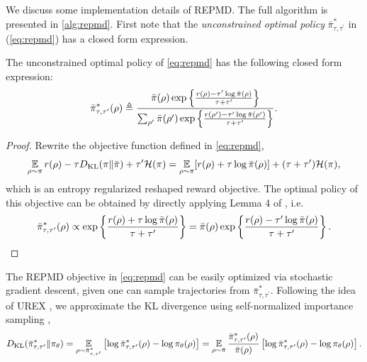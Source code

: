 \documentclass{article} %
\begin{document}
We discuss some implementation details of REPMD. The full algorithm is presented in \cref{alg:repmd}.
First note that the \emph{unconstrained optimal policy} $\bar{\pi}_{\tau,\tau^{\prime}}^*$ in (\ref{eq:repmd}) has a closed form expression.
\begin{lem}
\label{lem:opt_pi_ref}
The unconstrained optimal policy of \cref{eq:repmd} has the following closed form expression:
\begin{equation*}
	\bar{\pi}_{\tau,\tau^{\prime}}^*(\rho) \triangleq \frac{\bar{\pi}(\rho) \exp\left\{ \frac{r(\rho)-\tau^{\prime} \log \bar{\pi}(\rho) }{ \tau+\tau^{\prime}} \right\}}{ \sum_{\rho^{\prime}}{\bar{\pi}(\rho^{\prime}) \exp\left\{ \frac{r(\rho^{\prime})-\tau^{\prime} \log \bar{\pi}(\rho^{\prime})}{ \tau+\tau^{\prime}} \right\} } }.
\end{equation*}
\end{lem}
\begin{proof}
Rewrite the objective function defined in \cref{eq:repmd},
\begin{equation}
	\operatorname*{\mathbb{E}}\limits_{\rho \sim \pi} r(\rho)  - \tau D_{\mathrm{KL}}(\pi \| \bar{\pi}) + \tau^{\prime} \mathcal{H}(\pi) = \operatorname*{\mathbb{E}}\limits_{\rho \sim \pi} [r(\rho) + \tau \log \bar{\pi}(\rho)] + (\tau+\tau^{\prime}) \mathcal{H}(\pi),
\end{equation}
which is an entropy regularized reshaped reward objective. The optimal policy of this objective can be obtained by directly applying Lemma 4 of \citet{nachum2017bridging}, i.e.
\begin{equation}
\label{pi_bar_star_tau_tauprime_prop_form}
	\bar{\pi}_{\tau,\tau^{\prime}}^*(\rho)\propto \exp\left\{ \frac{r(\rho)+\tau \log \bar{\pi}(\rho)}{\tau+\tau^{\prime}} \right\} = \bar{\pi}(\rho) \exp\left\{ \frac{r(\rho)-\tau^{\prime} \log \bar{\pi}(\rho)}{\tau+\tau^{\prime}} \right\}. \qedhere
\end{equation}
\end{proof}
The REPMD objective in \cref{eq:repmd} can be easily optimized via stochastic gradient descent, given one can sample trajectories from $\bar{\pi}_{\tau,\tau^{\prime}}^*$.
Following the idea of UREX \citep{nachum2017improving}, we approximate the KL divergence using self-normalized importance sampling \citep{owen2013monte},
\begin{equation}
\label{eq:importance_sampling_kl}
D_{\mathrm{KL}}(\bar{\pi}_{\tau,\tau^{\prime}}^* \| \pi_\theta) = \operatorname*{\mathbb{E}}_{\rho \sim \bar{\pi}_{\tau,\tau^{\prime}}^* } \left[ \log \bar{\pi}_{\tau,\tau^{\prime}}^*(\rho) - \log \pi_\theta(\rho) \right] = \operatorname*{\mathbb{E}}_{\rho\sim \bar{\pi}} \frac{\bar{\pi}_{\tau,\tau^{\prime}}^*(\rho)}{\bar{\pi}(\rho)} \left[ \log \bar{\pi}_{\tau,\tau^{\prime}}^*(\rho) - \log \pi_\theta(\rho) \right].
\end{equation}
\end{document}
